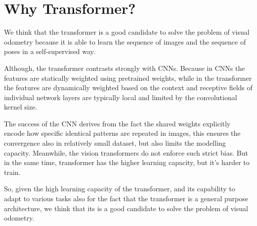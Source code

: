 \section{Why Transformer?}\label{sec:why-transformer}

We think that the transformer is a good candidate to solve the problem of visual odometry because it is able to learn the sequence of images and the sequence of poses in a self-supervised way.

Although, the transformer contrasts strongly with CNNs.
Because in CNNs the features are statically weighted using pretrained weights, while in the transformer the features are dynamically weighted based on the context and receptive fields of individual network layers are typically local and limited by the convolutional kernel size.

The success of the CNN derives from the fact the shared weights explicitly encode how specific identical patterns are repeated in images, this ensures the convergence also in relatively small dataset, but also limits the modelling capacity.
Meanwhile, the vision transformers do not enforce such strict bias.
But in the same time, transformer has the higher learning capacity, but it's harder to train.

So, given the high learning capacity of the transformer, and its capability to adapt to various tasks also for the fact that the transformer is a general purpose architecture, we think that its is a good candidate to solve the problem of visual odometry.
